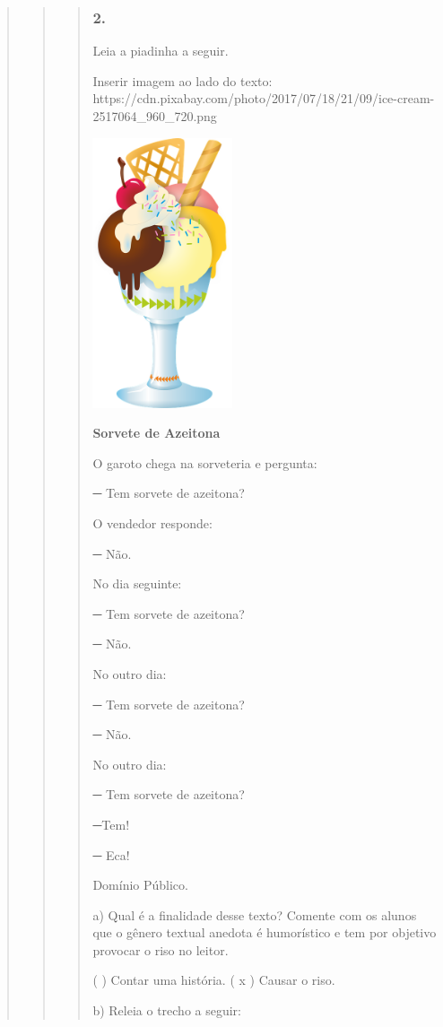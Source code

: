 \begin{quote}
\begin{quote}
\begin{quote}
\subsubsection{2. }\label{section-56}

Leia a piadinha a seguir.

Inserir imagem ao lado do texto:
https://cdn.pixabay.com/photo/2017/07/18/21/09/ice-cream-2517064\_960\_720.png

\includegraphics[width=1.61997in,height=3.13542in]{media/image20.png}

\textbf{Sorvete de Azeitona}

O garoto chega na sorveteria e pergunta:

─ Tem sorvete de azeitona?

O vendedor responde:

─ Não.

No dia seguinte:

─ Tem sorvete de azeitona?

─ Não.

No outro dia:

─ Tem sorvete de azeitona?

─ Não.

No outro dia:

─ Tem sorvete de azeitona?

─Tem!

─ Eca!

Domínio Público.

a) Qual é a finalidade desse texto? Comente com os alunos que o gênero
textual anedota é humorístico e tem por objetivo provocar o riso no
leitor.

( ) Contar uma história. ( x ) Causar o riso.

b) Releia o trecho a seguir:


\end{quote}
\end{quote}
\end{quote}
